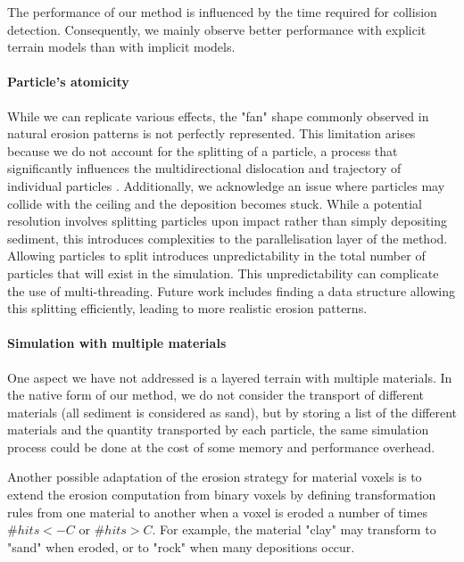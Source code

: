 The performance of our method is influenced by the time required for collision detection. Consequently, we mainly observe better performance with explicit terrain models than with implicit models.

\paragraph{Particle's atomicity}
While we can replicate various effects, the "fan" shape commonly observed in natural erosion patterns is not perfectly represented. This limitation arises because we do not account for the splitting of a particle, a process that significantly influences the multidirectional dislocation and trajectory of individual particles \cite{Ranz1960}. Additionally, we acknowledge an issue where particles may collide with the ceiling and the deposition becomes stuck. While a potential resolution involves splitting particles upon impact rather than simply depositing sediment, this introduces complexities to the parallelisation layer of the method. Allowing particles to split introduces unpredictability in the total number of particles that will exist in the simulation. This unpredictability can complicate the use of multi-threading. Future work includes finding a data structure allowing this splitting efficiently, leading to more realistic erosion patterns.

\paragraph{Simulation with multiple materials}
One aspect we have not addressed is a layered terrain with multiple materials. In the native form of our method, we do not consider the transport of different materials (all sediment is considered as sand), but by storing a list of the different materials and the quantity transported by each particle, the same simulation process could be done at the cost of some memory and performance overhead.

Another possible adaptation of the erosion strategy for material voxels is to extend the erosion computation from binary voxels by defining transformation rules from one material to another when a voxel is eroded a number of times $\#hits < -C$ or $\#hits > C$. For example, the material "clay" may transform to "sand" when eroded, or to "rock" when many depositions occur.


